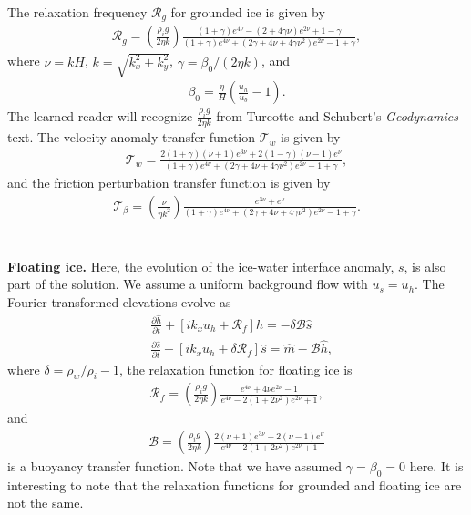 \documentclass[paper=a4, fontsize=11pt]{article}
\begin{document}
The relaxation frequency $\mathcal{R}_g$ for grounded ice is given by
\begin{align}
\mathcal{R}_g = \left(\frac{\rho_i g }{2\eta k}\right)\frac{ (1+\gamma)e^{4\nu} -(2+4\gamma\nu)e^{2\nu} +1-\gamma  }{ (1+\gamma)e^{4\nu} + (2\gamma+4\nu+4\gamma\nu^2)e^{2\nu} -1 + \gamma  },
\end{align}
where $\nu = kH$, $k=\sqrt{k_x^2+k_y^2}$, $\gamma = \beta_0/(2\eta k)$, and
\begin{align}
\beta_0  = \frac{\eta}{H}\left(\frac{u_h}{u_b} -1\right).
\end{align}
The learned reader will recognize $\frac{\rho_i g }{2\eta k}$ from Turcotte and Schubert's \emph{Geodynamics} text.
The velocity anomaly transfer function $\mathcal{T}_w$ is given by
\begin{align}
\mathcal{T}_w = \frac{2(1+\gamma)(\nu+1)e^{3\nu}+2(1-\gamma)(\nu-1)e^{\nu}  }{(1+\gamma)e^{4\nu} + (2\gamma+4\nu+4\gamma\nu^2)e^{2\nu} -1 + \gamma },
\end{align}
and the friction perturbation transfer function is given by
\begin{align}
\mathcal{T}_{\beta} =  \left(\frac{\nu}{\eta k^2}\right) \frac{e^{3\nu} + e^{\nu}}{ (1+\gamma)e^{4\nu} + (2\gamma+4\nu+4\gamma\nu^2)e^{2\nu} -1 + \gamma  }.
\end{align}
\\ \\
\textbf{Floating ice.} Here, the evolution of the ice-water interface anomaly, $s$,
is also part of the solution. We assume a uniform background flow with $u_s = u_h$.
The Fourier transformed elevations evolve as
\begin{align}
&\frac{\partial \widehat{h}}{\partial t}+ \left[ik_x u_h  + \mathcal{R}_f\right]\widehat{h} = -\delta\mathcal{B}\widehat{s}\label{hf}\\
&\frac{\partial \widehat{s}}{\partial t}+ [ik_xu_h + \delta\mathcal{R}_f]\widehat{s} = \widehat{m} - \mathcal{B} \widehat{h}, \label{sf}
\end{align}
where $\delta = \rho_w/\rho_i -1$, the relaxation function for floating ice is
\begin{align}
\mathcal{R}_f = \left(\frac{\rho_i g}{2\eta k}\right) \frac{e^{4\nu} +4\nu e^{2\nu} -1 }{e^{4\nu} -2(1+2\nu^2)e^{2\nu} +1}, \label{Rf}
\end{align}
and
\begin{align}
\mathcal{B} = \left(\frac{\rho_i g}{2\eta k}\right) \frac{ 2(\nu+1)e^{3\nu}+2(\nu-1)e^{\nu} }{e^{4\nu} -2(1+2\nu^2)e^{2\nu} +1} \label{B}
\end{align}
is a buoyancy transfer function. Note that we have assumed $\gamma=\beta_0=0$ here.
It is interesting to note that the relaxation functions for grounded and floating
ice are not the same.
\end{document}
